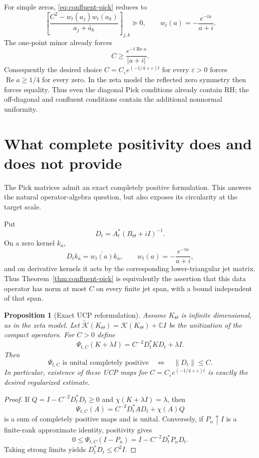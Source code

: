 \documentclass[11pt]{amsart}
\newtheorem{proposition}[theorem]{Proposition}
\theoremstyle{definition}
\theoremstyle{remark}
\DeclareMathOperator{\Repart}{Re}
\newcommand{\C}{\mathbb C}
\newcommand{\Kcal}{\mathcal K}
\newcommand{\eps}{\varepsilon}
\newcommand{\norm}[1]{\left\lVert #1\right\rVert}
\newcommand{\abs}[1]{\left\lvert #1\right\rvert}
\begin{document}
For simple zeros, \eqref{eq:confluent-pick} reduces to
\begin{equation}\label{eq:simple-pick}
 \left[
  \frac{C^2-w_t(a_j)\overline{w_t(a_k)}}
       {a_j+\bar a_k}
 \right]_{j,k}\succeq0,
 \qquad
 w_t(a)=-\frac{e^{-ta}}{a+i}.
\end{equation}
The one-point minor already forces
\begin{equation}\label{eq:one-point}
 C\geq\frac{e^{-t\Repart a}}{\abs{a+i}}.
\end{equation}
Consequently the desired choice
$C=C_\eps e^{(-1/4+\eps)t}$ for every $\eps>0$ forces
$\Repart a\geq1/4$ for every zero.  In the zeta model the reflected zero
symmetry then forces equality.  Thus even the diagonal Pick conditions
already contain RH; the off-diagonal and confluent conditions contain the
additional nonnormal uniformity.

\section{What complete positivity does and does not provide}
\label{sec:CP}

The Pick matrices admit an exact completely positive formulation.  This
answers the natural operator-algebra question, but also exposes its
circularity at the target scale.

Put
\[
 D_t=A_t^*(B_\Theta+iI)^{-1}.
\]
On a zero kernel $k_a$,
\[
 D_tk_a=\overline{w_t(a)}k_a,
 \qquad w_t(a)=-\frac{e^{-ta}}{a+i},
\]
and on derivative kernels it acts by the corresponding lower-triangular jet
matrix.  Thus Theorem~\ref{thm:confluent-pick} is equivalently the assertion
that this data operator has norm at most $C$ on every finite jet span, with a
bound independent of that span.

\begin{proposition}[Exact UCP reformulation]
\label{prop:UCP}
Assume $K_\Theta$ is infinite dimensional, as in the zeta model.
Let $\widetilde{\Kcal}(K_\Theta)=\Kcal(K_\Theta)+\C I$ be the unitization of
the compact operators.  For $C>0$ define
\[
 \Psi_{t,C}(K+\lambda I)=C^{-2}D_t^*KD_t+\lambda I.
\]
Then
\[
 \Psi_{t,C}\text{ is unital completely positive}
 \quad\Longleftrightarrow\quad
 \norm{D_t}\leq C.
\]
In particular, existence of these UCP maps for
$C=C_\eps e^{(-1/4+\eps)t}$ is exactly the desired regularized estimate.
\end{proposition}

\begin{proof}
If $Q=I-C^{-2}D_t^*D_t\geq0$ and
$\chi(K+\lambda I)=\lambda$, then
\[
 \Psi_{t,C}(A)=C^{-2}D_t^*AD_t+\chi(A)Q
\]
is a sum of completely positive maps and is unital.  Conversely, if
$P_n\uparrow I$ is a finite-rank approximate identity, positivity gives
\[
 0\leq\Psi_{t,C}(I-P_n)=I-C^{-2}D_t^*P_nD_t.
\]
Taking strong limits yields $D_t^*D_t\leq C^2I$.
\end{proof}
\end{document}
